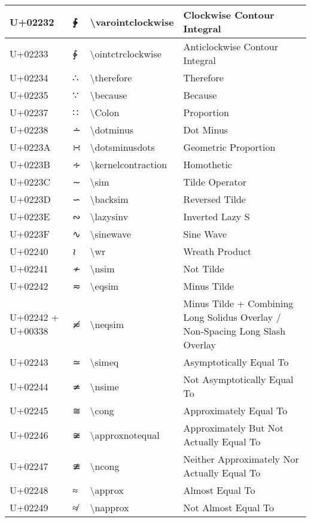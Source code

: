 \begin{table}[h]
\begin{tabulary}{\linewidth}{|L|L|L|L|}
\hline
U+02232 & ∲ & {\textbackslash}varointclockwise & Clockwise Contour Integral \\
\hline
U+02233 & ∳ & {\textbackslash}ointctrclockwise & Anticlockwise Contour Integral \\
\hline
U+02234 & ∴ & {\textbackslash}therefore & Therefore \\
\hline
U+02235 & ∵ & {\textbackslash}because & Because \\
\hline
U+02237 & ∷ & {\textbackslash}Colon & Proportion \\
\hline
U+02238 & ∸ & {\textbackslash}dotminus & Dot Minus \\
\hline
U+0223A & ∺ & {\textbackslash}dotsminusdots & Geometric Proportion \\
\hline
U+0223B & ∻ & {\textbackslash}kernelcontraction & Homothetic \\
\hline
U+0223C & ∼ & {\textbackslash}sim & Tilde Operator \\
\hline
U+0223D & ∽ & {\textbackslash}backsim & Reversed Tilde \\
\hline
U+0223E & ∾ & {\textbackslash}lazysinv & Inverted Lazy S \\
\hline
U+0223F & ∿ & {\textbackslash}sinewave & Sine Wave \\
\hline
U+02240 & ≀ & {\textbackslash}wr & Wreath Product \\
\hline
U+02241 & ≁ & {\textbackslash}nsim & Not Tilde \\
\hline
U+02242 & ≂ & {\textbackslash}eqsim & Minus Tilde \\
\hline
U+02242 + U+00338 & ≂̸ & {\textbackslash}neqsim & Minus Tilde + Combining Long Solidus Overlay / Non-Spacing Long Slash Overlay \\
\hline
U+02243 & ≃ & {\textbackslash}simeq & Asymptotically Equal To \\
\hline
U+02244 & ≄ & {\textbackslash}nsime & Not Asymptotically Equal To \\
\hline
U+02245 & ≅ & {\textbackslash}cong & Approximately Equal To \\
\hline
U+02246 & ≆ & {\textbackslash}approxnotequal & Approximately But Not Actually Equal To \\
\hline
U+02247 & ≇ & {\textbackslash}ncong & Neither Approximately Nor Actually Equal To \\
\hline
U+02248 & ≈ & {\textbackslash}approx & Almost Equal To \\
\hline
U+02249 & ≉ & {\textbackslash}napprox & Not Almost Equal To \\
\hline

\end{tabulary}
\end{table}
